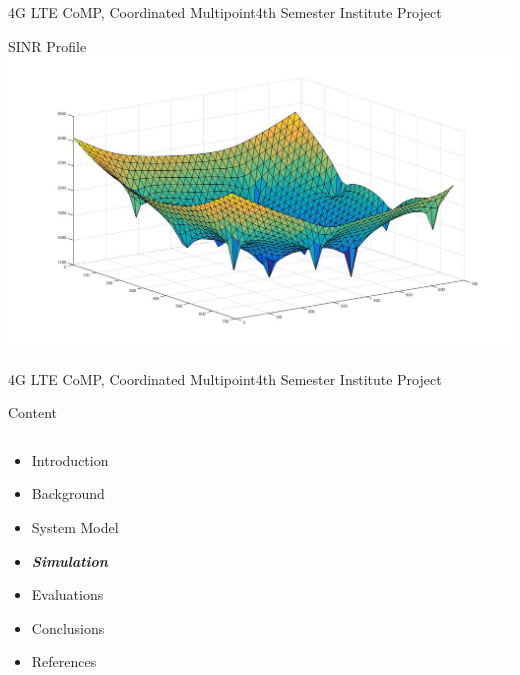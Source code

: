 \documentclass[xcolor={cmyk}]{beamer}
\begin{document}
  \begin{frame}{4G LTE CoMP, Coordinated Multipoint}{4th Semester Institute Project}
	 \begin{block}{SINR Profile}
		 \includegraphics[width=\linewidth,height=\textheight,keepaspectratio]{sinr.jpg}
	 \end{block}
 \end{frame}
 
\begin{frame}{4G LTE CoMP, Coordinated Multipoint}{4th Semester Institute Project}
	\begin{block}{Content}
		\begin{columns}
			\begin{column}{.9\textwidth}
				\begin{itemize}
					\item Introduction
					\item Background
					\item System Model
					\item \textbf{\emph{Simulation}}
					\item Evaluations
					\item Conclusions
					\item References
				\end{itemize}
			\end{column}
		\end{columns}
	\end{block}
\end{frame}
\end{document}
